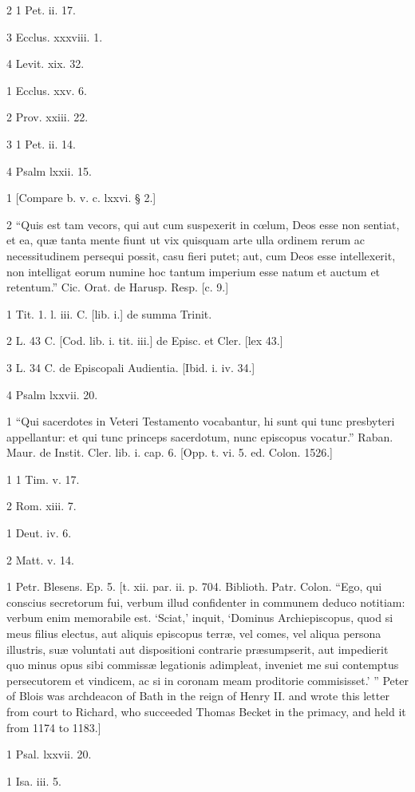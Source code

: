 2
1 Pet. ii. 17.

3
Ecclus. xxxviii. 1.

4
Levit. xix. 32.

1
Ecclus. xxv. 6.

2
Prov. xxiii. 22.

3
1 Pet. ii. 14.

4
Psalm lxxii. 15.

1
[Compare b. v. c. lxxvi. § 2.]

2
“Quis est tam vecors, qui aut cum suspexerit in cœlum, Deos esse non sentiat, et ea, quæ tanta mente fiunt ut vix quisquam arte ulla ordinem rerum ac necessitudinem persequi possit, casu fieri putet; aut, cum Deos esse intellexerit, non intelligat eorum numine hoc tantum imperium esse natum et auctum et retentum.” Cic. Orat. de Harusp. Resp. [c. 9.]

1
Tit. 1. l. iii. C. [lib. i.] de summa Trinit.

2
L. 43 C. [Cod. lib. i. tit. iii.] de Episc. et Cler. [lex 43.]

3
L. 34 C. de Episcopali Audientia. [Ibid. i. iv. 34.]

4
Psalm lxxvii. 20.

1
“Qui sacerdotes in Veteri Testamento vocabantur, hi sunt qui tunc presbyteri appellantur: et qui tunc princeps sacerdotum, nunc episcopus vocatur.” Raban. Maur. de Instit. Cler. lib. i. cap. 6. [Opp. t. vi. 5. ed. Colon. 1526.]

1
1 Tim. v. 17.

2
Rom. xiii. 7.

1
Deut. iv. 6.

2
Matt. v. 14.

1
Petr. Blesens. Ep. 5. [t. xii. par. ii. p. 704. Biblioth. Patr. Colon. “Ego, qui conscius secretorum fui, verbum illud confidenter in communem deduco notitiam: verbum enim memorabile est. ‘Sciat,’ inquit, ‘Dominus Archiepiscopus, quod si meus filius electus, aut aliquis episcopus terræ, vel comes, vel aliqua persona illustris, suæ voluntati aut dispositioni contrarie præsumpserit, aut impedierit quo minus opus sibi commissæ legationis adimpleat, inveniet me sui contemptus persecutorem et vindicem, ac si in coronam meam proditorie commisisset.’ ” Peter of Blois was archdeacon of Bath in the reign of Henry II. and wrote this letter from court to Richard, who succeeded Thomas Becket in the primacy, and held it from 1174 to 1183.]

1
Psal. lxxvii. 20.

1
Isa. iii. 5.

